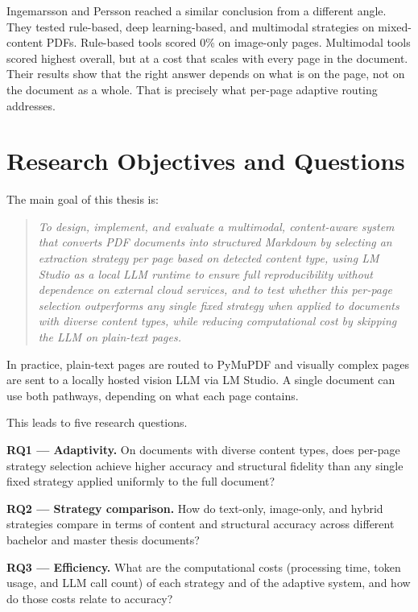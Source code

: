 Ingemarsson and Persson \autocite{ingemarsson2024} reached a similar conclusion
from a different angle. They tested rule-based, deep learning-based, and
multimodal strategies on mixed-content PDFs. Rule-based tools scored 0\% on
image-only pages. Multimodal tools scored highest overall, but at a cost that
scales with every page in the document. Their results show that the right
answer depends on what is on the page, not on the document as a whole. That
is precisely what per-page adaptive routing addresses.

\section{Research Objectives and Questions}

The main goal of this thesis is:

\begin{quote}
\textit{To design, implement, and evaluate a multimodal, content-aware system
that converts PDF documents into structured Markdown by selecting an extraction
strategy per page based on detected content type, using LM Studio as a local
LLM runtime to ensure full reproducibility without dependence on external cloud
services, and to test whether this per-page selection outperforms any single
fixed strategy when applied to documents with diverse content types, while
reducing computational cost by skipping the LLM on plain-text pages.}
\end{quote}

In practice, plain-text pages are routed to PyMuPDF and visually complex pages
are sent to a locally hosted vision LLM via LM Studio. A single document can
use both pathways, depending on what each page contains.

This leads to five research questions.

\textbf{RQ1 --- Adaptivity.} On documents with diverse content types, does
per-page strategy selection achieve higher accuracy and structural fidelity
than any single fixed strategy applied uniformly to the full document?

\textbf{RQ2 --- Strategy comparison.} How do text-only, image-only, and hybrid
strategies compare in terms of content and structural accuracy across different
bachelor and master thesis documents?

\textbf{RQ3 --- Efficiency.} What are the computational costs (processing time,
token usage, and LLM call count) of each strategy and of the adaptive system,
and how do those costs relate to accuracy?

